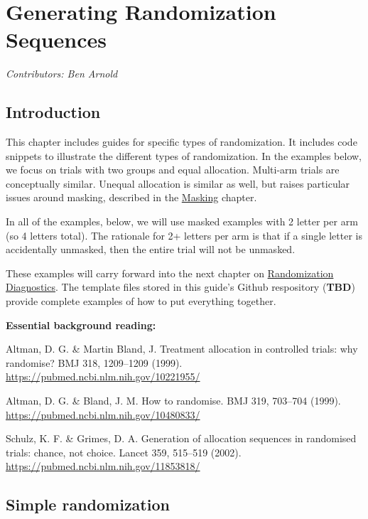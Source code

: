 \documentclass[
]{book}
\begin{document}
\hypertarget{sequences}{%
\chapter{Generating Randomization Sequences}\label{sequences}}

\emph{Contributors: Ben Arnold}

\hypertarget{introduction}{%
\section{Introduction}\label{introduction}}

This chapter includes guides for specific types of randomization. It includes code snippets to illustrate the different types of randomization. In the examples below, we focus on trials with two groups and equal allocation. Multi-arm trials are conceptually similar. Unequal allocation is similar as well, but raises particular issues around masking, described in the \protect\hyperlink{masking}{Masking} chapter.

In all of the examples, below, we will use masked examples with 2 letter per arm (so 4 letters total). The rationale for 2+ letters per arm is that if a single letter is accidentally unmasked, then the entire trial will not be unmasked.

These examples will carry forward into the next chapter on \protect\hyperlink{randomizationdiagnostics}{Randomization Diagnostics}. The template files stored in this guide's Github respository (\textbf{TBD}) provide complete examples of how to put everything together.

\textbf{Essential background reading:}

Altman, D. G. \& Martin Bland, J. Treatment allocation in controlled trials: why randomise? BMJ 318, 1209--1209 (1999). \url{https://pubmed.ncbi.nlm.nih.gov/10221955/} \citep{Altman1999-zc}

Altman, D. G. \& Bland, J. M. How to randomise. BMJ 319, 703--704 (1999). \url{https://pubmed.ncbi.nlm.nih.gov/10480833/} \citep{Altman1999-da}

Schulz, K. F. \& Grimes, D. A. Generation of allocation sequences in randomised trials: chance, not choice. Lancet 359, 515--519 (2002). \url{https://pubmed.ncbi.nlm.nih.gov/11853818/} \citep{Schulz2002-jf}

\hypertarget{simple-randomization}{%
\section{Simple randomization}\label{simple-randomization}}
\end{document}
